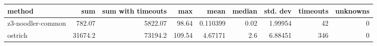 \begin{tabular}{lrrrrrrrr}
\hline
 method            &      sum &   sum with timeouts &    max &     mean &   median &   std. dev &   timeouts &   unknowns \\
\hline
 z3-noodler-common &   782.07 &             5822.07 &  98.64 & 0.110399 &     0.02 &    1.99954 &         42 &          0 \\
 ostrich           & 31674.2  &            73194.2  & 109.54 & 4.67171  &     2.6  &    6.88451 &        346 &          0 \\
\hline
\end{tabular}
